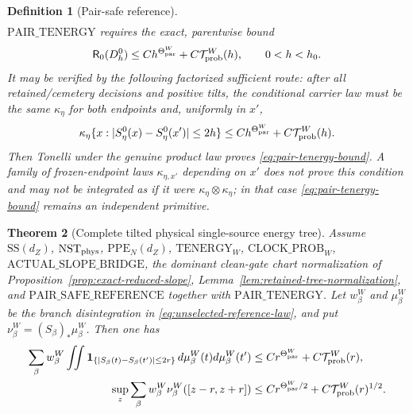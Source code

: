 \documentclass[11pt]{article}
\newtheorem{theorem}{Theorem}[section]
\newtheorem{definition}[theorem]{Definition}
\begin{document}
\begin{definition}[Pair-safe reference]
\begin{align}
 \label{eq:complete-energy-tail}
\end{align}
$\mathrm{PAIR\_TENERGY}$ requires the exact, parentwise bound
\begin{equation}
\label{eq:pair-tenergy-bound}
 \mathsf R_0(D_h^0)
 \le Ch^{\Theta_{\rm par}^{W}}+C\mathcal T_{\rm prob}^{W}(h),
 \qquad 0<h<h_0.
\end{equation}
It may be verified by the following factorized sufficient route: after all
retained/cemetery decisions and positive tilts, the conditional carrier law
must be the same $\kappa_\eta$ for both endpoints and, uniformly in
$x'$,
\begin{equation}
\label{eq:pair-tenergy-factorized-route}
 \kappa_\eta\{x:
 |S_\eta^0(x)-S_\eta^0(x')|\le2h\}
 \le Ch^{\Theta_{\rm par}^{W}}+C\mathcal T_{\rm prob}^{W}(h).
\end{equation}
Then Tonelli under the genuine product law proves
\eqref{eq:pair-tenergy-bound}.  A family of frozen-endpoint laws
$\kappa_{\eta,x'}$ depending on $x'$ does not prove this condition and may
not be integrated as if it were
$\kappa_\eta\otimes\kappa_\eta$; in that case
\eqref{eq:pair-tenergy-bound} remains an independent primitive.
\end{definition}

\begin{theorem}[Complete tilted physical single-source energy tree]
\label{thm:direct-slope-small-ball}
Assume $\mathrm{SS}(d_Z)$, $\mathrm{NST}_{\rm phys}$,
$\mathrm{PPE}_{N}(d_Z)$, $\mathrm{TENERGY}_{W}$,
$\mathrm{CLOCK\_PROB}_{W}$,
$\mathrm{ACTUAL\_SLOPE\_BRIDGE}$, the dominant clean-gate chart
normalization of Proposition~\ref{prop:exact-reduced-slope},
Lemma~\ref{lem:retained-tree-normalization}, and
$\mathrm{PAIR\_SAFE\_REFERENCE}$ together with
$\mathrm{PAIR\_TENERGY}$.  Let $w_\beta^{W}$ and $\mu_\beta^{W}$ be the
branch disintegration in \eqref{eq:unselected-reference-law}, and put
$\nu_\beta^{W}=(S_\beta)_*\mu_\beta^{W}$.  Then
one has
\begin{align}
 \sum_\beta w_\beta^{W}\iint
   \mathbf 1_{\{|S_\beta(t)-S_\beta(t')|\le2r\}}
   \,d\mu_\beta^{W}(t)d\mu_\beta^{W}(t')
 &\le Cr^{\Theta_{\rm par}^{W}}+C\mathcal T_{\rm prob}^{W}(r),\label{eq:conditional-energy-bound}\\
 \sup_z\sum_\beta w_\beta^{W}\nu_\beta^{W}([z-r,z+r])
 &\le Cr^{\Theta_{\rm par}^{W}/2}+C\mathcal T_{\rm prob}^{W}(r)^{1/2}.
 \label{eq:slope-value-small-ball}
\end{align}
\end{theorem}
\end{document}
